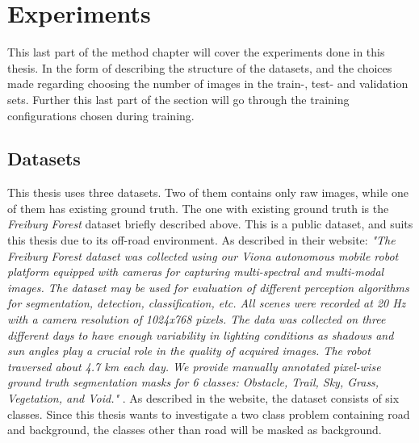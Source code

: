 \documentclass[USenglish]{ifimaster}  %
\begin{document}
\section{Experiments}
This last part of the method chapter will cover the experiments done in this thesis. In the form of describing the structure of the datasets, and the choices made regarding choosing the number of images in the train-, test- and validation sets. Further this last part of the section will go through the training configurations chosen during training.  
\subsection{Datasets}\label{datasets}
This thesis uses three datasets. Two of them contains only raw images, while one of them has existing ground truth. The one with existing ground truth is the \textit{Freiburg Forest} dataset briefly described above. This is a public dataset, and suits this thesis due to its off-road environment. As described in their website:
\newline
\newline
\textit{"The Freiburg Forest dataset was collected using our Viona autonomous mobile robot platform equipped with cameras for capturing multi-spectral and multi-modal images. The dataset may be used for evaluation of different perception algorithms for segmentation, detection, classification, etc. All scenes were recorded at 20 Hz with a camera resolution of 1024x768 pixels. The data was collected on three different days to have enough variability in lighting conditions as shadows and sun angles play a crucial role in the quality of acquired images. The robot traversed about 4.7 km each day. We provide manually annotated pixel-wise ground truth segmentation masks for 6 classes: Obstacle, Trail, Sky, Grass, Vegetation, and Void."} \cite{website:deepscene_freiburg_forest_website}. 
\newline
\newline
As described in the website, the dataset consists of six classes. Since this thesis wants to investigate a two class problem containing road and background, the classes other than road will be masked as background.
\end{document}
